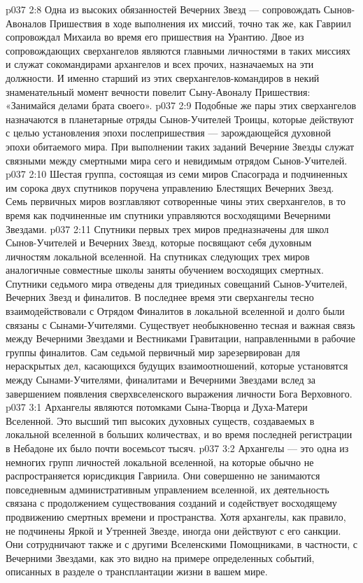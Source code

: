 \vs p037 2:8 Одна из высоких обязанностей Вечерних Звезд --- сопровождать Сынов\hyp{}Авоналов Пришествия в ходе выполнения их миссий, точно так же, как Гавриил сопровождал Михаила во время его пришествия на Урантию. Двое из сопровождающих сверхангелов являются главными личностями в таких миссиях и служат сокомандирами архангелов и всех прочих, назначаемых на эти должности. И именно старший из этих сверхангелов\hyp{}командиров в некий знаменательный момент вечности повелит Сыну\hyp{}Авоналу Пришествия: «Занимайся делами брата своего».
\vs p037 2:9 Подобные же пары этих сверхангелов назначаются в планетарные отряды Сынов\hyp{}Учителей Троицы, которые действуют с целью установления эпохи послепришествия --- зарождающейся духовной эпохи обитаемого мира. При выполнении таких заданий Вечерние Звезды служат связными между смертными мира сего и невидимым отрядом Сынов\hyp{}Учителей.
\vs p037 2:10 \pc {} Шестая группа, состоящая из семи миров Спасограда и подчиненных им сорока двух спутников поручена управлению Блестящих Вечерних Звезд. Семь первичных миров возглавляют сотворенные чины этих сверхангелов, в то время как подчиненные им спутники управляются восходящими Вечерними Звездами.
\vs p037 2:11 Спутники первых трех миров предназначены для школ Сынов\hyp{}Учителей и Вечерних Звезд, которые посвящают себя духовным личностям локальной вселенной. На спутниках следующих трех миров аналогичные совместные школы заняты обучением восходящих смертных. Спутники седьмого мира отведены для триединых совещаний Сынов\hyp{}Учителей, Вечерних Звезд и финалитов. В последнее время эти сверхангелы тесно взаимодействовали с Отрядом Финалитов в локальной вселенной и долго были связаны с Сынами\hyp{}Учителями. Существует необыкновенно тесная и важная связь между Вечерними Звездами и Вестниками Гравитации, направленными в рабочие группы финалитов. Сам седьмой первичный мир зарезервирован для нераскрытых дел, касающихся будущих взаимоотношений, которые установятся между Сынами\hyp{}Учителями, финалитами и Вечерними Звездами вслед за завершением появления сверхвселенского выражения личности Бога Верховного.
\vs p037 3:1 Архангелы являются потомками Сына\hyp{}Творца и Духа\hyp{}Матери Вселенной. Это высший тип высоких духовных существ, создаваемых в локальной вселенной в больших количествах, и во время последней регистрации в Небадоне их было почти восемьсот тысяч.
\vs p037 3:2 Архангелы --- это одна из немногих групп личностей локальной вселенной, на которые обычно не распространяется юрисдикция Гавриила. Они совершенно не занимаются повседневным административным управлением вселенной, их деятельность связана с продолжением существования созданий и содействует восходящему продвижению смертных времени и пространства. Хотя архангелы, как правило, не подчинены Яркой и Утренней Звезде, иногда они действуют с его санкции. Они сотрудничают также и с другими Вселенскими Помощниками, в частности, с Вечерними Звездами, как это видно на примере определенных событий, описанных в разделе о трансплантации жизни в вашем мире.
